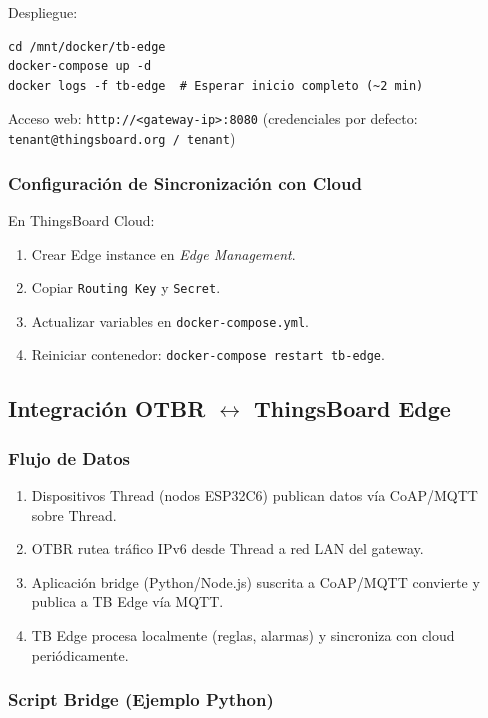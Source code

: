 Despliegue:
\begin{verbatim}
cd /mnt/docker/tb-edge
docker-compose up -d
docker logs -f tb-edge  # Esperar inicio completo (~2 min)
\end{verbatim}

Acceso web: \texttt{http://<gateway-ip>:8080} (credenciales por defecto: \texttt{tenant@thingsboard.org / tenant})

\subsubsection{Configuración de Sincronización con Cloud}

En ThingsBoard Cloud:
\begin{enumerate}
    \item Crear Edge instance en \textit{Edge Management}.
    \item Copiar \texttt{Routing Key} y \texttt{Secret}.
    \item Actualizar variables en \texttt{docker-compose.yml}.
    \item Reiniciar contenedor: \texttt{docker-compose restart tb-edge}.
\end{enumerate}

\subsection{Integración OTBR $\leftrightarrow$ ThingsBoard Edge}

\subsubsection{Flujo de Datos}

\begin{enumerate}
    \item Dispositivos Thread (nodos ESP32C6) publican datos vía CoAP/MQTT sobre Thread.
    \item OTBR rutea tráfico IPv6 desde Thread a red LAN del gateway.
    \item Aplicación bridge (Python/Node.js) suscrita a CoAP/MQTT convierte y publica a TB Edge vía MQTT.
    \item TB Edge procesa localmente (reglas, alarmas) y sincroniza con cloud periódicamente.
\end{enumerate}

\subsubsection{Script Bridge (Ejemplo Python)}

